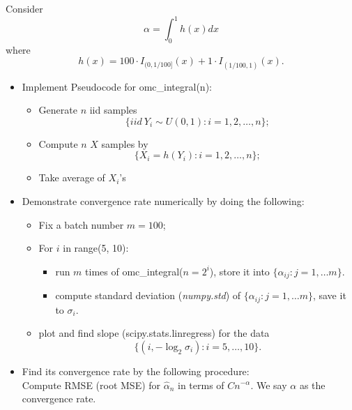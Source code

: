 \documentclass{article}
\begin{document}
Consider 
$$\alpha = \int_0^1 h(x) dx$$
where
$$h(x) = 100 \cdot I_{(0, 1/100]}(x) + 1\cdot I_{(1/100, 1)} (x).$$

\begin{itemize}

 \item Implement  
Pseudocode for omc\_integral(n):
\begin{itemize}
\item Generate $n$ iid samples $$\{iid \ Y_i\sim U(0,1): i = 1, 2, \ldots, n\};$$
\item Compute $n$ $X$ samples by
$$\{X_i = h(Y_i): i = 1, 2, \ldots, n\};$$
\item Take average of $X_i$'s
\end{itemize}


 \item Demonstrate convergence rate numerically by doing the following:
\begin{itemize}
 \item Fix a batch number $m=100$;
 \item For $i$ in range(5, 10): 
\begin{itemize}
 \item run  $m$ times of omc\_integral($n=2^i$), store it into $\{\alpha_{ij}: j = 1, \ldots m\}.$
 \item compute standard deviation ({\it numpy.std}) of $\{\alpha_{ij}: j = 1, \ldots m\}$, save it to $\sigma_i$.
\end{itemize}
\item plot and find slope (scipy.stats.linregress)  for the data
$$\{(i, -\log_2 \sigma_i): i = 5, \ldots, 10\}.$$
\end{itemize}
 \item Find its convergence rate by the following procedure: \\
 Compute RMSE (root MSE) for $\hat \alpha_n$ in terms of $C n^{-\alpha}$.
 We say $\alpha$ as the convergence rate.
\end{itemize}
\end{document}
